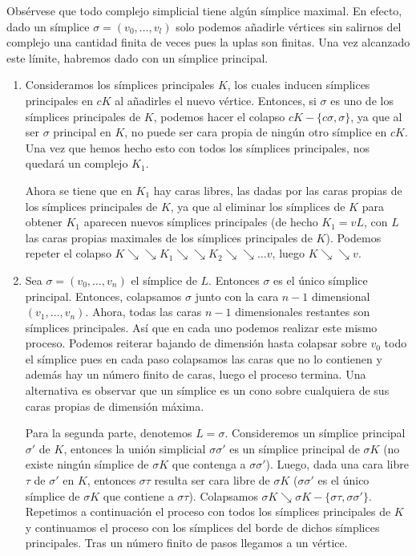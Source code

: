 \documentclass[twoside]{article}
\newcommand{\colapso}{{\searrow\!\!\!\!\searrow}}
\begin{document}
\begin{solucion}
Obsérvese que todo complejo simplicial tiene algún símplice maximal. En efecto, dado un símplice $\sigma=(v_0,\dots, v_l)$ solo podemos añadirle vértices sin salirnos del complejo una cantidad finita de veces pues la uplas son finitas. Una vez alcanzado este límite, habremos dado con un símplice principal.
\begin{enumerate}
\item Consideramos los símplices principales $K$, los cuales inducen símplices principales en $cK$ al añadirles el nuevo vértice. Entonces, si $\sigma$ es uno de los símplices principales de $K$, podemos hacer el colapso $cK-\{c\sigma,\sigma\}$, ya que al ser $\sigma$ principal en $K$, no puede ser cara propia de ningún otro símplice en $cK$.
Una vez que hemos hecho esto con todos los símplices principales, nos quedará un complejo $K_1$.

Ahora se tiene que en $K_1$ hay caras libres, las dadas por las caras propias de los símplices principales de $K$, ya que al eliminar los símplices de $K$ para obtener $K_1$ aparecen nuevos símplices principales (de hecho $K_1 = vL$, con $L$ las caras propias maximales de los símplices principales de $K$).
Podemos repeter el colapso $K \colapso K_1 \colapso K_2 \colapso \dots v$, luego $K \colapso v$.

\item Sea $\sigma=(v_0,\dots, v_n)$ el símplice de $L$. Entonces $\sigma$ es el único símplice principal. Entonces, colapsamos $\sigma$ junto con la cara $n-1$ dimensional $(v_1,\dots, v_n)$. Ahora, todas las caras $n-1$ dimensionales restantes son símplices principales. Así que en cada uno podemos realizar este mismo proceso. Podemos reiterar bajando de dimensión hasta colapsar sobre $v_0$ todo el símplice pues en cada paso colapsamos las caras que no lo contienen y además hay un número finito de caras, luego el proceso termina. Una alternativa es observar que un símplice es un cono sobre cualquiera de sus caras propias de dimensión máxima.

Para la segunda parte, denotemos $L=\sigma$. Consideremos un símplice principal $\sigma'$ de $K$, entonces la unión simplicial $\sigma\sigma'$ es un símplice principal de $\sigma K$ (no existe ningún símplice de $\sigma K$ que contenga a $\sigma\sigma'$). Luego, dada una cara libre $\tau$ de $\sigma'$ en $K$, entonces $\sigma\tau$ resulta ser cara libre de $\sigma K$ ($\sigma\sigma'$ es el único símplice de $\sigma K$ que contiene a $\sigma\tau$). Colapsamos $\sigma K\searrow \sigma K-\{\sigma\tau,\sigma\sigma'\}$. Repetimos a continuación el proceso con todos los símplices principales de $K$ y continuamos el proceso con los símplices del borde de dichos símplices principales. Tras un número finito de pasos llegamos a un vértice.


\end{enumerate}
\end{solucion}
\end{document}
